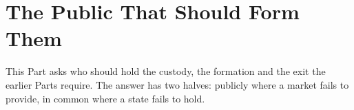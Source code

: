 \part{The Public That Should Form Them}

This Part asks who should hold the custody, the formation and the exit the earlier Parts require. The answer has two halves: publicly where a market fails to provide, in common where a state fails to hold.
